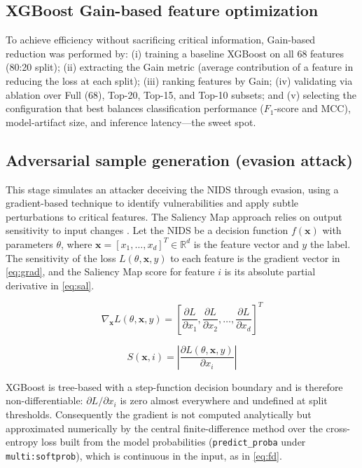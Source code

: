 \documentclass{iaesarticle}
\begin{document}
\subsection{XGBoost Gain-based feature optimization}
To achieve efficiency without sacrificing critical information, Gain-based reduction \cite{48} was performed by: (i) training a baseline XGBoost on all 68 features (80:20 split); (ii) extracting the Gain metric (average contribution of a feature in reducing the loss at each split); (iii) ranking features by Gain; (iv) validating via ablation over Full (68), Top-20, Top-15, and Top-10 subsets; and (v) selecting the configuration that best balances classification performance ($F_1$-score and MCC), model-artifact size, and inference latency---the sweet spot.

\subsection{Adversarial sample generation (evasion attack)}
This stage simulates an attacker deceiving the NIDS through evasion, using a gradient-based technique \cite{49} to identify vulnerabilities and apply subtle perturbations to critical features. The Saliency Map approach relies on output sensitivity to input changes \cite{50}. Let the NIDS be a decision function $f(\mathbf{x})$ with parameters $\theta$, where $\mathbf{x}=[x_1,\dots,x_d]^T\in\mathbb{R}^d$ is the feature vector and $y$ the label. The sensitivity of the loss $L(\theta,\mathbf{x},y)$ to each feature is the gradient vector in \eqref{eq:grad}, and the Saliency Map score for feature $i$ is its absolute partial derivative in \eqref{eq:sal}.

\begin{equation}\label{eq:grad}
\nabla_{\mathbf{x}} L(\theta, \mathbf{x}, y) = \left[ \frac{\partial L}{\partial x_1}, \frac{\partial L}{\partial x_2}, \dots, \frac{\partial L}{\partial x_d} \right]^T
\end{equation}

\begin{equation}\label{eq:sal}
S(\mathbf{x}, i) = \left| \frac{\partial L(\theta, \mathbf{x}, y)}{\partial x_i} \right|
\end{equation}

XGBoost is tree-based with a step-function decision boundary and is therefore non-differentiable: $\partial L/\partial x_i$ is zero almost everywhere and undefined at split thresholds. Consequently the gradient is not computed analytically but approximated numerically by the central finite-difference method over the cross-entropy loss built from the model probabilities (\texttt{predict\_proba} under \texttt{multi:softprob}), which is continuous in the input, as in \eqref{eq:fd}.
\end{document}
